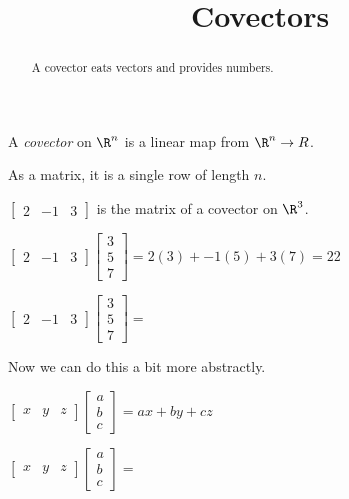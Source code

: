 \documentclass{ximera}
\title{Covectors}
\begin{document}
\begin{abstract}
  A covector eats vectors and provides numbers.
\end{abstract}

\begin{definition}
  A \textit{covector} on $\R^n$ is a linear map from $\R^n \to R$.

  As a matrix, it is a single row of length $n$.
\end{definition}

\begin{example}
  $\begin{bmatrix} 2 & -1 & 3 \end{bmatrix}$ is the matrix of a
  covector on $\R^3$.
\end{example}

\begin{question}
  \begin{solution}
    \begin{hint}
      $\begin{bmatrix} 2 & -1 & 3 \end{bmatrix} \begin{bmatrix} 3\\5\\7 \end{bmatrix} = 2(3)+-1(5)+3(7) = 22$
    \end{hint}
    $\begin{bmatrix} 2 & -1 & 3 \end{bmatrix} \begin{bmatrix} 3\\5\\7 \end{bmatrix} = $
  \end{solution}

  Now we can do this a bit more abstractly.

  \begin{hint}
    $\begin{bmatrix} x & y & z \end{bmatrix} \begin{bmatrix} a \\b\\c\end{bmatrix} = ax+by+cz$ 
  \end{hint}
  $\begin{bmatrix} x & y & z \end{bmatrix} \begin{bmatrix} a \\b\\c\end{bmatrix} =$ 
\end{question}
\end{document}
